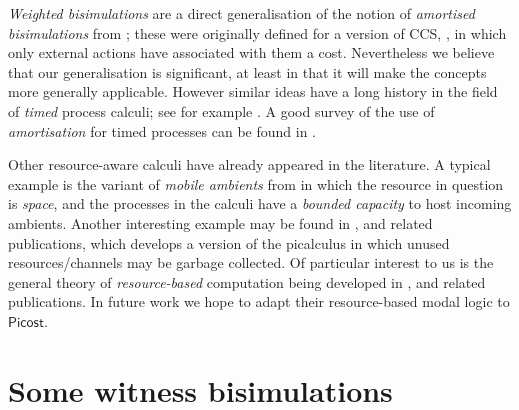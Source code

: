 \documentclass{LMCS}
\newcommand{\pfn}[1]{\mathsf{#1}}  \newcommand{\cfn}[1]{\mathsf{#1}}  \newcommand{\ownfnt}[1]{{\mathsf{#1}}}
\newcommand{\picost}{\ensuremath{\pfn{Picost}}\xspace}
\begin{document}
\emph{Weighted bisimulations} are a direct generalisation of the
notion of \emph{amortised bisimulations} from \cite{astrid}; these
were originally defined for a version of CCS, \cite{ccs}, in which
only external actions have associated with them a cost. Nevertheless
we believe that our generalisation is significant, at least in that it
will make the concepts more generally applicable. However similar ideas
have a long history in the field of \emph{timed} process calculi; see
for example \cite{Tofts94}. A good survey of the use of
\emph{amortisation} for timed processes can be found in \cite{speed}.

Other resource-aware calculi have already appeared in the
literature. A typical example is the variant of \emph{mobile ambients}
\cite{ambients} from \cite{vladi} in which the resource in question is
\emph{space}, and the processes in the calculi have a \emph{bounded
  capacity} to host incoming ambients.  Another interesting example
may be found in \cite{teller:tcs04}, and related publications, which
develops a version of the picalculus in which unused
resources/channels may be garbage collected.  Of particular interest
to us is the general theory of \emph{resource-based} computation being
developed in \cite{pym}, and related publications. In future work we
hope to adapt their resource-based modal logic to \picost.


\appendix


\section{Some witness bisimulations}
\end{document}
